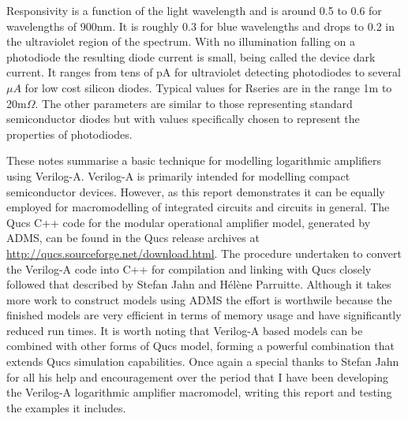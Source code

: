 Responsivity is a function of the light wavelength and is around 0.5
to 0.6 for wavelengths of 900nm. It is roughly 0.3 for blue
wavelengths and drops to 0.2 in the ultraviolet region of the
spectrum. With no illumination falling on a photodiode the resulting
diode current is small, being called the device dark current. It
ranges from tens of pA for ultraviolet detecting photodiodes to
several $\mu A$ for low cost silicon diodes. Typical values for
Rseries are in the range 1m to 20m$\Omega$.  The other parameters are
similar to those representing standard semiconductor diodes but with
values specifically chosen to represent the properties of photodiodes.


These notes summarise a basic technique for modelling logarithmic
amplifiers using Verilog-A.  Verilog-A is primarily intended for
modelling compact semiconductor devices.  However, as this report
demonstrates it can be equally employed for macromodelling of
integrated circuits and circuits in general. The Qucs C++ code for the
modular operational amplifier model, generated by ADMS, can be found
in the Qucs release archives at
\url{http://qucs.sourceforge.net/download.html}.  The procedure
undertaken to convert the Verilog-A code into C++ for compilation and
linking with Qucs closely followed that described by Stefan Jahn and
H\'{e}l\`{e}ne Parruitte.  Although it takes more work to construct
models using ADMS the effort is worthwile because the finished models
are very efficient in terms of memory usage and have significantly
reduced run times. It is worth noting that Verilog-A based models can
be combined with other forms of Qucs model, forming a powerful
combination that extends Qucs simulation capabilities. Once again a
special thanks to Stefan Jahn for all his help and encouragement over
the period that I have been developing the Verilog-A logarithmic
amplifier macromodel, writing this report and testing the examples it
includes.
